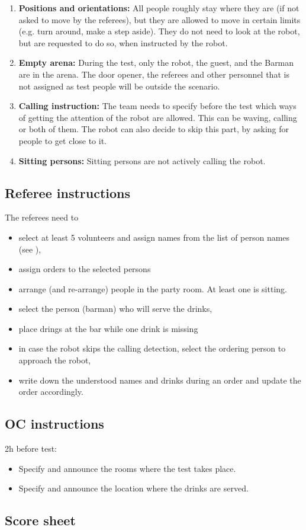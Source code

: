 \begin{enumerate}
	\item \textbf{Positions and orientations:} All people roughly stay where they are (if not asked to move by the referees), but they are allowed to move in certain limits (e.g. turn around, make a step aside). They do not need to look at the robot, but are requested to do so, when instructed by the robot.

	\item \textbf{Empty arena:} During the test, only the robot, the guest, and the Barman are in the arena. The door opener, the referees and other personnel that is not assigned as test people will be outside the scenario.

	\item \textbf{Calling instruction:} The team needs to specify before the test which ways of getting the attention of the robot are allowed. This can be waving, calling or both of them. The robot can also decide to skip this part, by asking for people to get close to it.
	
	\item \textbf{Sitting persons:} Sitting persons are not actively calling the robot.
\end{enumerate}

\subsection{Referee instructions}

The referees need to
\begin{itemize}
	\item select at least 5 volunteers and assign names from the list of person names (see ),
	\item assign orders to the selected persons
	\item arrange (and re-arrange) people in the party room. At least one is sitting.
	\item select the person (barman) who will serve the drinks,
	\item place drings at the bar while one drink is missing
	\item in case the robot skips the calling detection, select the ordering person to approach the robot,
	\item write down the understood names and drinks during an order and update the order accordingly.
\end{itemize}

\subsection{OC instructions}

2h before test:
\begin{itemize}
	\item Specify and announce the rooms where the test takes place.
	\item Specify and announce the location where the drinks are served.
\end{itemize}

\newpage
\subsection{Score sheet}

